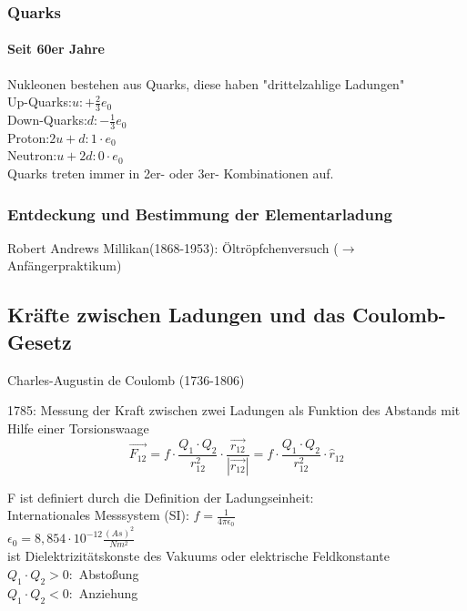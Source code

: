 \documentclass[11pt]{article}
\begin{document}
\newpage

\subsubsection{ Quarks }	
\paragraph{Seit 60er Jahre}
Nukleonen bestehen aus Quarks, diese haben "drittelzahlige Ladungen"
\\
Up-Quarks:$u:+\frac{2}{3	}e_0$
\\
Down-Quarks:$d:-\frac{1}{3}e_0$
\\
Proton:$2u+d: 1\cdot e_0$
\\
Neutron:$u+2d: 0\cdot e_0$
\\

Quarks treten immer in 2er- oder 3er- Kombinationen auf.
\\

\subsubsection{Entdeckung und Bestimmung der Elementarladung}

Robert Andrews Millikan(1868-1953): Öltröpfchenversuch ($\rightarrow$ Anfängerpraktikum)


\subsection{Kräfte zwischen Ladungen und das Coulomb-Gesetz} 

Charles-Augustin de Coulomb (1736-1806)

1785: Messung der Kraft zwischen zwei Ladungen als Funktion des Abstands mit Hilfe einer Torsionswaage \hfill \\

$$ \boxed{\vec{F_{12}} = f\cdot\frac{Q_1\cdot Q_2}{r^2_{12}}\cdot\frac{\vec{r_{12}}}{|\vec{r_{12}}|} = f\cdot\frac{Q_1\cdot Q_2}{r^2_{12}}\cdot \hat{r}_{12}} $$

\noindent F ist definiert durch die Definition der Ladungseinheit:
\\
Internationales Messsystem (SI): $f=\frac{1}{4\pi\epsilon_0}$
\\
$\epsilon_0=8,854\cdot10^{-12}\frac{(As)^2}{Nm^2}$
\\
ist Dielektrizitätskonste des Vakuums oder elektrische Feldkonstante
\\
$Q_1\cdot Q_2 > 0:$ Abstoßung
\\
$Q_1\cdot Q_2 < 0:$ Anziehung
\end{document}
